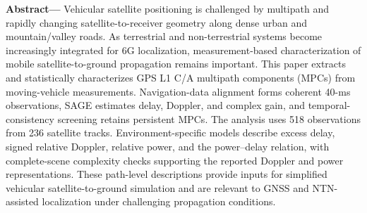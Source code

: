 \documentclass[10pt]{article}
\begin{document}
\vspace{3pt}
\textbf{Abstract---} Vehicular satellite positioning is challenged by multipath and rapidly changing satellite-to-receiver geometry along dense urban and mountain/valley roads. As terrestrial and non-terrestrial systems become increasingly integrated for 6G localization, measurement-based characterization of mobile satellite-to-ground propagation remains important. This paper extracts and statistically characterizes GPS L1 C/A multipath components (MPCs) from moving-vehicle measurements. Navigation-data alignment forms coherent 40-ms observations, SAGE estimates delay, Doppler, and complex gain, and temporal-consistency screening retains persistent MPCs. The analysis uses 518 observations from 236 satellite tracks. Environment-specific models describe excess delay, signed relative Doppler, relative power, and the power--delay relation, with complete-scene complexity checks supporting the reported Doppler and power representations. These path-level descriptions provide inputs for simplified vehicular satellite-to-ground simulation and are relevant to GNSS and NTN-assisted localization under challenging propagation conditions.
\end{document}
